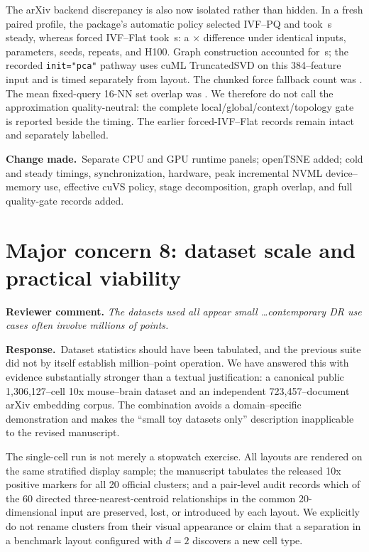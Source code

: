 \documentclass[11pt]{article}
\newcommand{\reviewcomment}[1]{%
  \medskip\noindent\textbf{Reviewer comment.} \emph{#1}\par\smallskip}
\newcommand{\response}{%
  \noindent\textcolor{responseblue}{\textbf{Response.}}\ }
\newcommand{\change}{%
  \noindent\textcolor{responseblue}{\textbf{Change made.}}\ }
\begin{document}
The arXiv backend discrepancy is also now isolated rather than hidden. In a
fresh paired profile, the package's automatic policy selected IVF--PQ and took
\ArxivDireAutoProfileSteadySeconds{}\,s steady, whereas forced IVF--Flat took
\ArxivDireIvfFlatProfileSteadySeconds{}\,s: a
\ArxivDireAutoSpeedupVsIvfFlat{}$\times$ difference under identical inputs,
parameters, seeds, repeats, and H100. Graph construction accounted for
\ArxivDireAutoKnnGraphSeconds{}\,s; the recorded
\texttt{init="pca"} pathway uses cuML TruncatedSVD on this 384--feature input
and is timed separately from layout. The chunked force fallback count was
\ArxivDireAutoChunkedFallbackCalls{}. The mean fixed-query 16-NN set overlap
was \ArxivDireBackendGraphOverlap{}. We therefore do not call the approximation
quality-neutral: the complete local/global/context/topology gate is reported
beside the timing. The earlier forced-IVF--Flat records remain intact and
separately labelled.

\change Separate CPU and GPU runtime panels; openTSNE added; cold and
steady timings, synchronization, hardware, peak incremental NVML
device--memory use, effective cuVS policy, stage decomposition, graph overlap,
and full quality-gate records added.

\section*{Major concern 8: dataset scale and practical viability}

\reviewcomment{The datasets used all appear small \ldots contemporary DR use
cases often involve millions of points.}

\response Dataset statistics should have been tabulated, and the previous suite
did not by itself establish million--point operation. We have answered this
with evidence substantially stronger than a textual justification: a canonical
public 1,306,127--cell 10x mouse--brain dataset and an independent
723,457--document arXiv embedding corpus. The combination avoids a
domain--specific demonstration and makes the ``small toy datasets only''
description inapplicable to the revised manuscript.

The single-cell run is not merely a stopwatch exercise. All layouts are
rendered on the same stratified display sample; the manuscript tabulates the
released 10x positive markers for all 20 official clusters; and a pair-level
audit records which of the 60 directed three-nearest-centroid relationships in
the common 20-dimensional input are preserved, lost, or introduced by each
layout. We explicitly do not rename clusters from their visual appearance or
claim that a separation in a benchmark layout configured with $d=2$ discovers
a new cell type.
\end{document}
